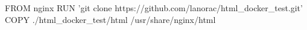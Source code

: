 FROM nginx
RUN 'git clone https://github.com/lanorac/html_docker_test.git'
COPY ./html_docker_test/html /usr/share/nginx/html
